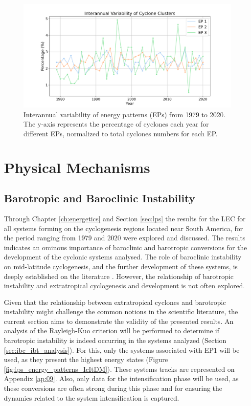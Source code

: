 \begin{figure}[!htbp]
    \centering
    \includegraphics[width=\textwidth]{figs_6/lps_interannual_variability.png}
    \caption[Energy Patterns - Interannual Variability]{Interannual variability of energy patterns (EPs) from 1979 to 2020. The y-axis represents the percentage of cyclones each year for different EPs, normalized to total cyclones numbers for each EP.}
    \label{fig:lps_interannual_variability}
\end{figure}

\section{Physical Mechanisms}

\subsection{Barotropic and Baroclinic Instability}\label{sec:ibt_ibc}

Through Chapter \ref{ch:energetics} and Section \ref{sec:lps} the results for the LEC for all systems forming on the cyclogenesis regions located near South America, for the period ranging from 1979 and 2020 were explored and discussed. The results indicates an ominous importance of baroclinic and barotropic conversions for the development of the cyclonic systems analysed. The role of baroclinic instability on mid-latitude cyclogenesis, and the further development of these systems, is deeply established on the literature \citep{bjerknes1922life,eady1949long,charney1947dynamics,petterssen1971development,hoskins1990existence}. However, the relationship of barotropic instability and extratropical cyclogenesis and development is not often explored. 

Given that the relationship between extratropical cyclones and barotropic instability might challenge the common notions in the scientific literature, the current section aims to demonstrate the validity of the presented results. An analysis of the Rayleigh-Kuo criterion will be performed to determine if barotropic instability is indeed occurring in the systems analyzed (Section \ref{sec:ibc_ibt_analysis}). For this, only the systems associated with EP1 will be used, as they present the highest energy states (Figure \ref{fig:lps_energy_patterns_IcItDM}). These systems tracks are represented on Appendix \ref{ap:09}. Also, only data for the intensification phase will be used, as these conversions are often strong during this phase and for ensuring the dynamics related to the system intensification is captured.

